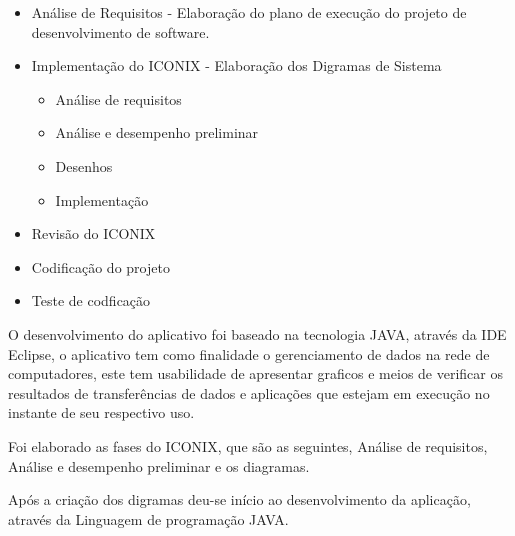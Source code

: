
\begin{itemize}
  \item Análise de Requisitos - Elaboração do plano de execução do projeto de
  desenvolvimento de software.
  \item Implementação do ICONIX - Elaboração dos Digramas de Sistema
  	
  	\begin{itemize}
 	 	\item Análise de requisitos
  		\item Análise e desempenho preliminar
  		\item Desenhos
  		\item Implementação
	\end{itemize}
  	
  \item Revisão do ICONIX
  \item Codificação do projeto 
  \item Teste de codficação 
\end{itemize}

\par O desenvolvimento do aplicativo foi baseado na tecnologia JAVA, através da
IDE Eclipse, o aplicativo tem como finalidade o gerenciamento de dados na rede
de computadores, este tem usabilidade de apresentar graficos e meios de
verificar os resultados de transferências de dados e aplicações que estejam em
execução no instante de seu respectivo uso.

\par Foi elaborado as fases do ICONIX, que são as seguintes, Análise de
requisitos, Análise e desempenho preliminar e os diagramas.

\par Após a criação dos digramas deu-se início ao desenvolvimento da aplicação,
através da Linguagem de programação JAVA.





